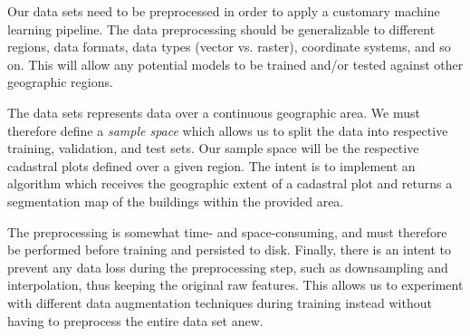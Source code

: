 Our data sets need to be preprocessed in order to apply a customary machine learning pipeline.
The data preprocessing should be generalizable to different regions, data formats, data types (vector vs. raster), coordinate systems, and so on.
This will allow any potential models to be trained and/or tested against other geographic regions.

The data sets represents data over a continuous geographic area.
We must therefore define a \textit{sample space} which allows us to split the data into respective training, validation, and test sets.
Our sample space will be the respective cadastral plots defined over a given region.
The intent is to implement an algorithm which receives the geographic extent of a cadastral plot and returns a segmentation map of the buildings within the provided area.

The preprocessing is somewhat time- and space-consuming, and must therefore be performed before training and persisted to disk.
Finally, there is an intent to prevent any data loss during the preprocessing step, such as downsampling and interpolation, thus keeping the original raw features.
This allows us to experiment with different data augmentation techniques during training instead without having to preprocess the entire data set anew.
